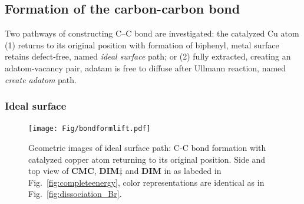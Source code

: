 \documentclass[%
 reprint,
 amsmath,amssymb,
 aps,
prb,
floatfix,
]{revtex4-2}
\newcommand{\comm}{\color{Purple}} %
\begin{document}

\subsection{Formation of the carbon-carbon bond}

{\color{blue}
Two pathways of constructing C--C bond are investigated: the catalyzed Cu atom (1) returns to its original position with formation of biphenyl, metal surface retains defect-free, named \textit{ideal surface} path; or (2) fully extracted, creating an adatom-vacancy pair, adatam is free to diffuse after Ullmann reaction, named \textit{create adatom} path. 
}

\subsubsection{Ideal surface}


\begin{figure}[hbt]
\centering
\texttt{[image: Fig/bondformlift.pdf]}
\caption{Geometric images of ideal surface path: C-C bond formation with catalyzed copper atom returning to its original position. Side and top view of \textbf{CMC}, \textbf{DIM$\ddagger$} and \textbf{DIM} in as labeded in Fig.~\ref{fig:completeenergy}, color representations are identical as in Fig.~\ref{fig:dissociation_Br}.}
\label{fig:bondformlift}
\end{figure}
\end{document}
